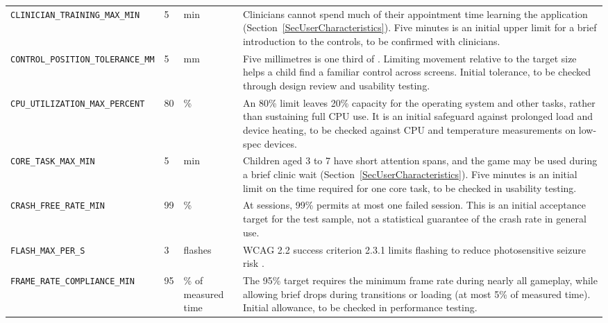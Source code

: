 \documentclass[10pt]{article}
\newcommand{\constref}[1]{%
    \hyperref[const:#1]{\texttt{\detokenize{#1}}}%
}
\begin{document}
\begin{longtable}{>{\raggedright\arraybackslash}p{} p{} >{\raggedright\arraybackslash}p{} >{\raggedright\arraybackslash}p{}}
\texttt{CLINICIAN\_TRAINING\_MAX\_MIN}
\label{const:CLINICIAN_TRAINING_MAX_MIN}
& 5 & min & Clinicians cannot spend much of their appointment time learning the application (Section~\ref{SecUserCharacteristics}). Five minutes is an initial upper limit for a brief introduction to the controls, to be confirmed with clinicians. \\

\texttt{CONTROL\_POSITION\_TOLERANCE\_MM}
\label{const:CONTROL_POSITION_TOLERANCE_MM}
& 5 & mm & Five millimetres is one third of \constref{TOUCH_TARGET_MIN}. Limiting movement relative to the target size helps a child find a familiar control across screens. Initial tolerance, to be checked through design review and usability testing. \\

\texttt{CPU\_UTILIZATION\_MAX\_PERCENT}
\label{const:CPU_UTILIZATION_MAX_PERCENT}
& 80 & \% & An 80\% limit leaves 20\% capacity for the operating system and other tasks, rather than sustaining full CPU use. It is an initial safeguard against prolonged load and device heating, to be checked against CPU and temperature measurements on low-spec devices. \\

\texttt{CORE\_TASK\_MAX\_MIN}
\label{const:CORE_TASK_MAX_MIN}
& 5 & min & Children aged 3 to 7 have short attention spans, and the game may be used during a brief clinic wait (Section~\ref{SecUserCharacteristics}). Five minutes is an initial limit on the time required for one core task, to be checked in usability testing. \\

\texttt{CRASH\_FREE\_RATE\_MIN}
\label{const:CRASH_FREE_RATE_MIN}
& 99 & \% & At \constref{TEST_SESSIONS_MIN} sessions, 99\% permits at most one failed session. This is an initial acceptance target for the test sample, not a statistical guarantee of the crash rate in general use. \\

\texttt{FLASH\_MAX\_PER\_S}
\label{const:FLASH_MAX_PER_S}
& 3 & flashes & WCAG 2.2 success criterion 2.3.1 limits flashing to reduce photosensitive seizure risk \cite{WCAG22}. \\

\texttt{FRAME\_RATE\_COMPLIANCE\_MIN}
\label{const:FRAME_RATE_COMPLIANCE_MIN}
& 95 & \% of measured time & The 95\% target requires the minimum frame rate during nearly all gameplay, while allowing brief drops during transitions or loading (at most 5\% of measured time). Initial allowance, to be checked in performance testing. \\


\end{longtable}
\end{document}

